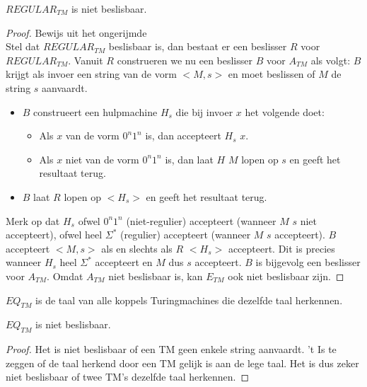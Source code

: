 \documentclass[main.tex]{subfiles}
\begin{document}
\begin{st}
  \label{st:regular-tm-niet-besl}
  $REGULAR_{TM}$ is niet beslisbaar.

  \begin{proof}
    Bewijs uit het ongerijmde\\
    Stel dat $REGULAR_{TM}$ beslisbaar is, dan bestaat er een beslisser $R$ voor $REGULAR_{TM}$.
    Vanuit $R$ construeren we nu een beslisser $B$ voor $A_{TM}$ als volgt:
    $B$ krijgt als invoer een string van de vorm $<M,s>$ en moet beslissen of $M$ de string $s$ aanvaardt.
    \begin{itemize}
    \item $B$ construeert een hulpmachine $H_{s}$ die bij invoer $x$ het volgende doet:
      \begin{itemize}
      \item Als $x$ van de vorm $0^{n}1^{n}$ is, dan accepteert $H_{s}$ $x$.
      \item Als $x$ niet van de vorm $0^{n}1^{n}$ is, dan laat $H$ $M$ lopen op $s$ en geeft het resultaat terug.
      \end{itemize}
    \item $B$ laat $R$ lopen op $<H_{s}>$ en geeft het resultaat terug.
    \end{itemize}
    Merk op dat $H_{s}$ ofwel $0^{n}1^{n}$ (niet-regulier) accepteert (wanneer $M$ $s$ niet accepteert), ofwel heel $\Sigma^{*}$ (regulier) accepteert (wanneer $M$ $s$ accepteert).
    $B$ accepteert $<M,s>$ als en slechts als $R$ $<H_{s}>$ accepteert.
    Dit is precies wanneer $H_{s}$ heel $\Sigma^{*}$ accepteert en $M$ dus $s$ accepteert.
    $B$ is bijgevolg een beslisser voor $A_{TM}$.
    Omdat $A_{TM}$ niet beslisbaar is, kan $E_{TM}$ ook niet beslisbaar zijn.
  \end{proof}
\end{st}

\begin{de}
  \label{de:eq-tm}
  $EQ_{TM}$ is de taal van alle koppels Turingmachines die dezelfde taal herkennen.
\end{de}

\begin{st}
  \label{st:eq-tm-besl}
  $EQ_{TM}$ is niet beslisbaar.

  \begin{proof}
    Het is niet beslisbaar of een TM geen enkele string aanvaardt.
    't Is te zeggen of de taal herkend door een TM gelijk is aan de lege taal.
    Het is dus zeker niet beslisbaar of twee TM's dezelfde taal herkennen.
  \end{proof}
\end{st}
\end{document}

